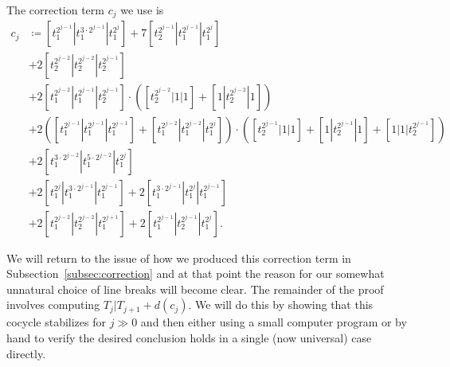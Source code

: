 \begin{dfn} \label{dfn:cj}
The correction term $c_j$ we use is
\begin{align*}
  c_j &\coloneqq [t_1^{2^{j-1}} | t_1^{3\cdot2^{j-1}} | t_1^{2^{j}}]
        + 7 [t_2^{2^{j-1}} | t_1^{2^{j-1}} | t_1^{2^{j}}] \\
      & + 2 [t_2^{2^{j-2}} | t_2^{2^{j-2}} | t_2^{2^{j-1}}] \\
      &+ 2 [t_1^{2^{j-2}} | t_1^{2^{j-1}} | t_2^{2^{j-1}}] \cdot \left( [t_2^{2^{j-2}}|1|1] + [1|t_2^{2^{j-2}}|1] \right) \\
      & + 2 \left([t_1^{2^{j-1}}|t_1^{2^{j-1}}|t_1^{2^{j-1}}] + [t_1^{2^{j-2}}|t_1^{2^{j-2}}|t_1^{2^{j}}] \right) \cdot \left( [t_2^{2^{j-1}}|1|1] + [1|t_2^{2^{j-1}}|1] + [1|1|t_2^{2^{j-1}}] \right) \\
      & + 2 [t_1^{3 \cdot 2^{j-2}}|t_1^{5 \cdot 2^{j-2}}|t_1^{2^{j}}] \\
      & + 2 [t_1^{2^{j}}|t_1^{3 \cdot 2^{j-1}}|t_1^{2^{j-1}}] + 2 [t_1^{3 \cdot 2^{j-1}}|t_1^{2^{j}}|t_1^{2^{j-1}}] \\
      & + 2 [t_1^{2^{j-2}}|t_2^{2^{j-2}}|t_1^{2^{j+1}}] + 2 [t_1^{2^{j-1}}|t_2^{2^{j-1}}|t_1^{2^{j}}].
\end{align*}
\end{dfn}


We will return to the issue of how we produced this correction term in Subsection~\ref{subsec:correction} and at that point the reason for our somewhat unnatural choice of line breaks will become clear. The remainder of the proof involves computing $T_j|T_{j+1} + d(c_j)$. We will do this by showing that this cocycle stabilizes for $j \gg 0$ and then either using a small computer program or by hand to verify the desired conclusion holds in a single (now universal) case directly.

